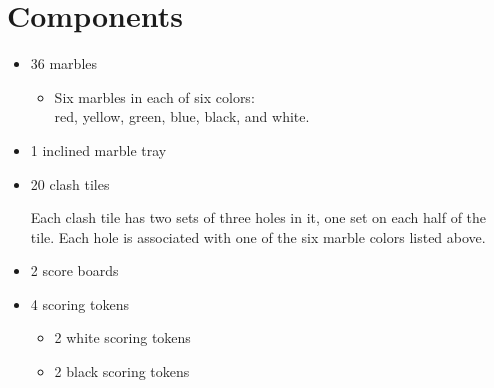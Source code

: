 \section*{Components}
\begin{itemize}[leftmargin=*]
\item 36 marbles
\begin{itemize}[leftmargin=*, nosep]
\vspace{-1ex}
\item Six marbles in each of six colors:\\red, yellow, green, blue, black, and white.
\end{itemize}
\item 1 inclined marble tray
\item 20 clash tiles

Each clash tile has two sets of three holes in it, one set on each half of the tile.
Each hole is associated with one of the six marble colors listed above.

\item 2 score boards
\item 4 scoring tokens
\begin{itemize}[leftmargin=*, nosep]
\vspace{-1ex}
\item 2 white scoring tokens
\item 2 black scoring tokens
\end{itemize}
\end{itemize}
